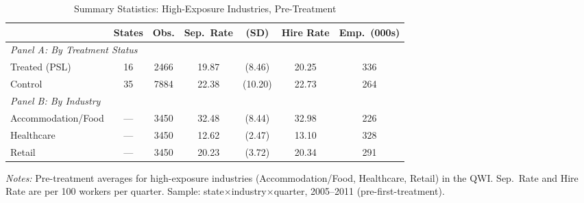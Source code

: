 \begin{table}[htbp]
\centering
\caption{Summary Statistics: High-Exposure Industries, Pre-Treatment}
\label{tab:sumstats}
\begin{tabular}{lcccccc}
\hline\hline
 & States & Obs. & Sep.\ Rate & (SD) & Hire Rate & Emp.\ (000s) \\
\hline
\multicolumn{7}{l}{\textit{Panel A: By Treatment Status}} \\[3pt]
Treated (PSL) & 16 & 2466 & 19.87 & (8.46) & 20.25 & 336 \\
Control & 35 & 7884 & 22.38 & (10.20) & 22.73 & 264 \\[6pt]
\multicolumn{7}{l}{\textit{Panel B: By Industry}} \\[3pt]
Accommodation/Food & --- & 3450 & 32.48 & (8.44) & 32.98 & 226 \\
Healthcare & --- & 3450 & 12.62 & (2.47) & 13.10 & 328 \\
Retail & --- & 3450 & 20.23 & (3.72) & 20.34 & 291 \\
\hline\hline
\end{tabular}
\begin{tablenotes}[flushleft]
\small
\item \textit{Notes:} Pre-treatment averages for high-exposure industries (Accommodation/Food, Healthcare, Retail) in the QWI. Sep.\ Rate and Hire Rate are per 100 workers per quarter. Sample: state$\times$industry$\times$quarter, 2005--2011 (pre-first-treatment).
\end{tablenotes}
\end{table}
